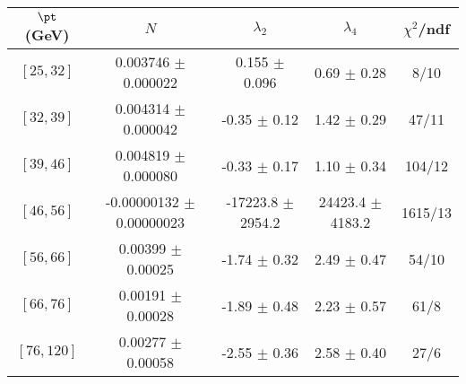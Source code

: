 \begin{tabular}{c||c|c|c|c}
$\pt$ (GeV) & $N$ & $\lambda_{2}$ & $\lambda_4$  & $\chi^2$/ndf  \\
\hline
$[25, 32]$ & 0.003746 $\pm$ 0.000022 & 0.155 $\pm$ 0.096 & 0.69 $\pm$ 0.28 & 8/10\\
$[32, 39]$ & 0.004314 $\pm$ 0.000042 & -0.35 $\pm$ 0.12 & 1.42 $\pm$ 0.29 & 47/11\\
$[39, 46]$ & 0.004819 $\pm$ 0.000080 & -0.33 $\pm$ 0.17 & 1.10 $\pm$ 0.34 & 104/12\\
$[46, 56]$ & -0.00000132 $\pm$ 0.00000023 & -17223.8 $\pm$ 2954.2 & 24423.4 $\pm$ 4183.2 & 1615/13\\
$[56, 66]$ & 0.00399 $\pm$ 0.00025 & -1.74 $\pm$ 0.32 & 2.49 $\pm$ 0.47 & 54/10\\
$[66, 76]$ & 0.00191 $\pm$ 0.00028 & -1.89 $\pm$ 0.48 & 2.23 $\pm$ 0.57 & 61/8\\
$[76, 120]$ & 0.00277 $\pm$ 0.00058 & -2.55 $\pm$ 0.36 & 2.58 $\pm$ 0.40 & 27/6\\
\end{tabular}

